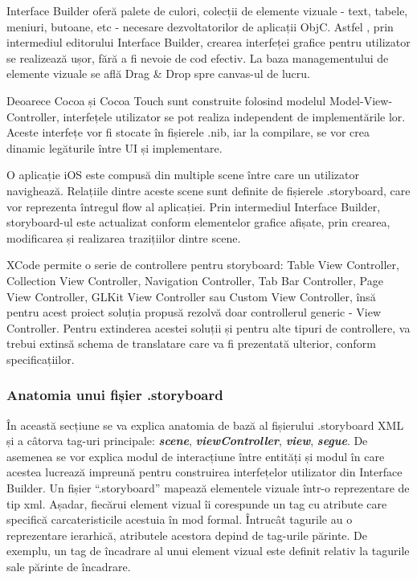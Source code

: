 Interface Builder oferă palete de culori, colecții de elemente vizuale - text, tabele, meniuri, butoane, etc - necesare dezvoltatorilor de aplicații ObjC. Astfel , prin intermediul editorului Interface Builder, crearea interfeței grafice pentru utilizator se realizează ușor, fără a fi nevoie de cod efectiv. La baza managementului de elemente vizuale se află Drag & Drop spre canvas-ul de lucru. 

Deoarece Cocoa și Cocoa Touch sunt construite folosind modelul Model-View-Controller, interfețele utilizator se pot realiza independent de implementările lor. Aceste interfețe vor fi stocate în fișierele .nib, iar la compilare, se vor crea dinamic legăturile între UI și implementare.

O aplicație iOS este compusă din multiple scene între care un utilizator navighează. Relațiile dintre aceste scene sunt definite de fișierele .storyboard, care vor reprezenta întregul flow al aplicației. Prin intermediul Interface Builder, storyboard-ul este actualizat conform elementelor grafice afișate, prin crearea, modificarea și realizarea trazițiilor dintre scene.

XCode permite o serie de controllere pentru storyboard: Table View Controller, Collection View Controller, Navigation Controller, Tab Bar Controller, Page View Controller, GLKit View Controller sau Custom View Controller, însă pentru acest proiect soluția propusă rezolvă doar controllerul generic - View Controller. Pentru extinderea acestei soluții și pentru alte tipuri de controllere, va trebui extinsă schema de translatare care va fi prezentată ulterior, conform specificațiilor.

\subsubsection{Anatomia unui fișier .storyboard}

În această secțiune se va explica anatomia de bază al fișierului .storyboard XML și a câtorva tag-uri principale: \textbf{\textit{scene}}, \textbf{\textit{viewController}}, \textbf{\textit{view}}, \textbf{\textit{segue}}. De asemenea se vor explica modul de interacțiune între entități și modul în care acestea lucrează impreună pentru construirea interfețelor utilizator din Interface Builder.
Un fișier “.storyboard” mapează elementele vizuale într-o reprezentare de tip xml. Așadar, fiecărui element vizual îi corespunde un tag cu atribute care specifică carcateristicile acestuia în mod formal. Întrucât tagurile au o reprezentare ierarhică, atributele acestora depind de tag-urile părinte. De exemplu, un tag de încadrare al unui element vizual este definit relativ la tagurile sale părinte de încadrare.

